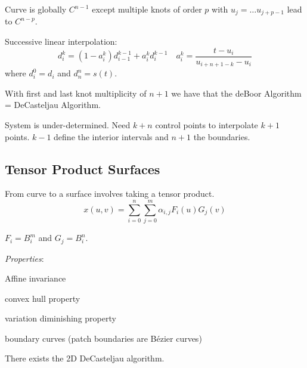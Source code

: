 \begin{theorem}
  Curve is globally \(C^{n-1}\) except multiple knots of order \(p\) with \(u_j = \ldots u_{j+p-1}\) lead to \(C^{n-p}\).
\end{theorem}

\begin{algorithm}
  Successive linear interpolation:
  \[d_i^k = (1 - a_i^k)d_{i-1}^{k-1} + a_i^k d_i^{k-1} \quad a_i^k = \frac{t - u_i}{u_{i+n+1-k} - u_i}\]
  where \(d_i^0 = d_i\) and \(d_n^n = s(t)\).
\end{algorithm}

\begin{theorem}
  With first and last knot multiplicity of \(n+1\) we have that the deBoor Algorithm = DeCasteljau Algorithm.
\end{theorem}

\begin{definition}
  System is under-determined. Need \(k+n\) control points to interpolate \(k+1\) points. \(k-1\) define the interior intervals and \(n+1\) the boundaries.
\end{definition}

\subsection{Tensor Product Surfaces}
From curve to a surface involves taking a tensor product.
\[x(u, v) = \sum_{i=0}^{n}\sum_{j=0}^{m}\alpha_{i, j} F_i(u)G_j(v)\]

\begin{definition}
  \(F_i = B_i^m\) and \(G_j = B_i^n\).

  \textit{Properties}:
  \begin{itemize*}
    \item Affine invariance
    \item convex hull property
    \item variation diminishing property
    \item boundary curves (patch boundaries are Bézier curves)
  \end{itemize*}
\end{definition}

\begin{algorithm}[2D DeCasteljau]
  There exists the 2D DeCasteljau algorithm.
\end{algorithm}

